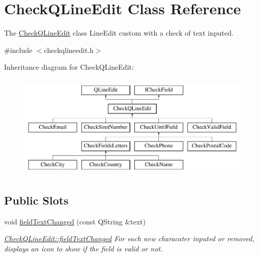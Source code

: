\hypertarget{classCheckQLineEdit}{\section{Check\+Q\+Line\+Edit Class Reference}
\label{classCheckQLineEdit}
}


The \hyperlink{classCheckQLineEdit}{Check\+Q\+Line\+Edit} class Line\+Edit custom with a check of text inputed.  




{\ttfamily \#include $<$checkqlineedit.\+h$>$}

Inheritance diagram for Check\+Q\+Line\+Edit\+:\begin{figure}[H]
\begin{center}
\leavevmode
\includegraphics[height=5.000000cm]{d1/da9/classCheckQLineEdit}
\end{center}
\end{figure}
\subsection*{Public Slots}
\begin{DoxyCompactItemize}
\item 
\hypertarget{classCheckQLineEdit_a137569359307e1b17449af3a72c5e80e}{void \hyperlink{classCheckQLineEdit_a137569359307e1b17449af3a72c5e80e}{field\+Text\+Changed} (const Q\+String \&text)}\label{classCheckQLineEdit_a137569359307e1b17449af3a72c5e80e}

\begin{DoxyCompactList}\small\item\em \hyperlink{classCheckQLineEdit_a137569359307e1b17449af3a72c5e80e}{Check\+Q\+Line\+Edit\+::field\+Text\+Changed} For each new characater inputed or removed, displays an icon to show if the field is valid or not. \end{DoxyCompactList}\end{DoxyCompactItemize}
